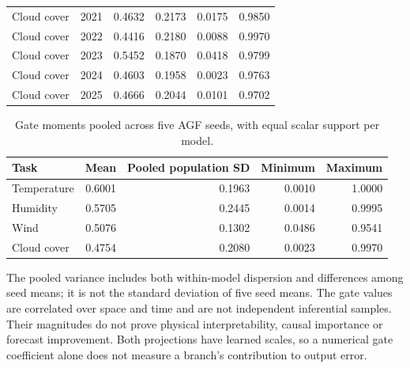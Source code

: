 \documentclass[10pt,a4paper]{article}
\begin{document}
\begin{table}[H]
\begin{tabular}{llrrrr}
Cloud cover & 2021 & 0.4632 & 0.2173 & 0.0175 & 0.9850 \\

Cloud cover & 2022 & 0.4416 & 0.2180 & 0.0088 & 0.9970 \\

Cloud cover & 2023 & 0.5452 & 0.1870 & 0.0418 & 0.9799 \\

Cloud cover & 2024 & 0.4603 & 0.1958 & 0.0023 & 0.9763 \\

Cloud cover & 2025 & 0.4666 & 0.2044 & 0.0101 & 0.9702 \\

\bottomrule\end{tabular}\end{table}

\begin{table}[H]\centering\small\setlength{\tabcolsep}{5pt}\setlength{\parskip}{0pt}

\caption{Gate moments pooled across five AGF seeds, with equal scalar support per model.}\label{tab:gate_pool}

\begin{tabular}{lrrrr}

\toprule
Task & Mean & Pooled population SD & Minimum & Maximum \\
\midrule

Temperature & 0.6001 & 0.1963 & 0.0010 & 1.0000 \\

Humidity & 0.5705 & 0.2445 & 0.0014 & 0.9995 \\

Wind & 0.5076 & 0.1302 & 0.0486 & 0.9541 \\

Cloud cover & 0.4754 & 0.2080 & 0.0023 & 0.9970 \\

\bottomrule\end{tabular}\end{table}

The pooled variance includes both within-model dispersion and differences among seed means; it is not the standard deviation of five seed means. The gate values are correlated over space and time and are not independent inferential samples. Their magnitudes do not prove physical interpretability, causal importance or forecast improvement. Both projections have learned scales, so a numerical gate coefficient alone does not measure a branch's contribution to output error.
\end{document}
